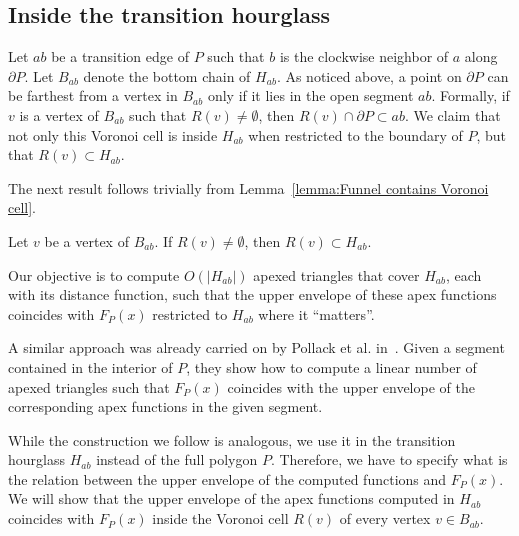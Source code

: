 \documentclass[a4paper,UKenglish]{lipics}
\newcommand{\F}[2]{\ensuremath{F_{\scriptscriptstyle #1}(#2)}}
\newcommand{\fn}[2]{\ensuremath{S_{\scriptscriptstyle #1}(#2)}}
\begin{document}
\subsection{Inside the transition hourglass}
Let $ab$ be a transition edge of $P$  such that $b$ is the clockwise neighbor of $a$ along $\partial P$.
Let $B_{ab}$ denote the bottom chain of $H_{ab}$.
As noticed above, a point on $\partial P$ can be farthest from a vertex in $B_{ab}$ only if it lies in the open segment $ab$.
Formally, if $v$ is a vertex of $B_{ab}$ such that $R(v)\neq \emptyset$, then $R(v)\cap \partial P \subset ab$.
We claim that not only this Voronoi cell is inside $H_{ab}$ when restricted to the boundary of $P$, but that $R(v)\subset H_{ab}$. 

The next result follows trivially from Lemma~\ref{lemma:Funnel contains Voronoi cell}.

\begin{corollary}\label{lemma:Cell contained in geodesic triangle}
Let $v$ be a vertex of $B_{ab}$. If $R(v)\neq \emptyset$, then $R(v) \subset H_{ab}$.
\end{corollary}


Our objective is to compute $O(|H_{ab}|)$ apexed triangles that cover $H_{ab}$, each with its distance function, such that the upper envelope of these apex functions coincides with $\F{P}{x}$ restricted to $H_{ab}$ where it ``matters''.

A similar approach was already carried on by Pollack et al. in~\cite[Section 3]{pollackComputingCenter}. 
Given a segment contained in the interior of $P$, they show 
how to compute a linear number of apexed triangles such that $\F{P}{x}$ coincides with the upper envelope of the corresponding apex functions in the given segment.

While the construction we follow is analogous, we use it in the transition hourglass $H_{ab}$ instead of the full polygon $P$. 
Therefore, we have to specify what is the relation between the upper envelope of the computed functions and $\F{P}{x}$. 
We will show that the upper envelope of the apex functions computed in $H_{ab}$ coincides with $\F{P}{x}$ inside the Voronoi cell $R(v)$ of every vertex $v\in B_{ab}$.
\end{document}
